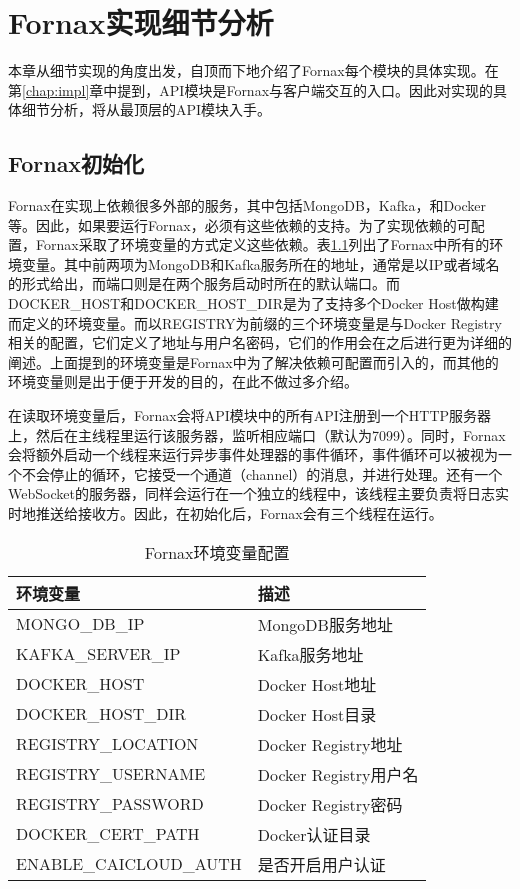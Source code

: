 \chapter{Fornax实现细节分析}
\label{chap:detail}

本章从细节实现的角度出发，自顶而下地介绍了Fornax每个模块的具体实现。在第\ref{chap:impl}章中提到，API模块是Fornax与客户端交互的入口。因此对实现的具体细节分析，将从最顶层的API模块入手。

\section{Fornax初始化}

Fornax在实现上依赖很多外部的服务，其中包括MongoDB，Kafka，和Docker等。因此，如果要运行Fornax，必须有这些依赖的支持。为了实现依赖的可配置，Fornax采取了环境变量的方式定义这些依赖。表\ref{tab:env}列出了Fornax中所有的环境变量。其中前两项为MongoDB和Kafka服务所在的地址，通常是以IP或者域名的形式给出，而端口则是在两个服务启动时所在的默认端口。而DOCKER\_HOST和DOCKER\_HOST\_DIR是为了支持多个Docker Host做构建而定义的环境变量。而以REGISTRY为前缀的三个环境变量是与Docker Registry相关的配置，它们定义了地址与用户名密码，它们的作用会在之后进行更为详细的阐述。上面提到的环境变量是Fornax中为了解决依赖可配置而引入的，而其他的环境变量则是出于便于开发的目的，在此不做过多介绍。

在读取环境变量后，Fornax会将API模块中的所有API注册到一个HTTP服务器上，然后在主线程里运行该服务器，监听相应端口（默认为7099）。同时，Fornax会将额外启动一个线程来运行异步事件处理器的事件循环，事件循环可以被视为一个不会停止的循环，它接受一个通道（channel）的消息，并进行处理。还有一个WebSocket的服务器，同样会运行在一个独立的线程中，该线程主要负责将日志实时地推送给接收方。因此，在初始化后，Fornax会有三个线程在运行。

\begin{table}[!hpb]
  \centering
  \caption{Fornax环境变量配置}
  \label{tab:env}
  \begin{tabular}{ll} \toprule
    环境变量 & 描述 \\ \midrule
    MONGO\_DB\_IP & MongoDB服务地址 \\
    KAFKA\_SERVER\_IP & Kafka服务地址  \\
    DOCKER\_HOST & Docker Host地址  \\
    DOCKER\_HOST\_DIR & Docker Host目录 \\
    REGISTRY\_LOCATION & Docker Registry地址  \\
    REGISTRY\_USERNAME & Docker Registry用户名  \\
    REGISTRY\_PASSWORD & Docker Registry密码  \\
    DOCKER\_CERT\_PATH & Docker认证目录  \\
    ENABLE\_CAICLOUD\_AUTH & 是否开启用户认证  \\ \bottomrule
  \end{tabular}
\end{table}

